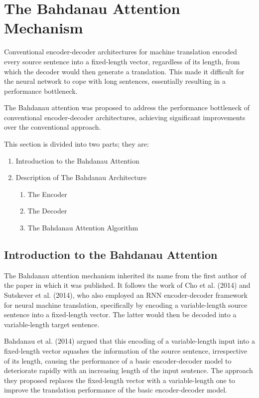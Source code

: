 \documentclass[10pt,a4paper]{article}
\begin{document}
\section{The Bahdanau Attention Mechanism}

Conventional encoder-decoder architectures for machine translation encoded every source sentence into a fixed-length vector, regardless of its length, from which the decoder would then generate a translation. This made it difficult for the neural network to cope with long sentences, essentially resulting in a performance bottleneck. 

The Bahdanau attention was proposed to address the performance bottleneck of conventional encoder-decoder architectures, achieving significant improvements over the conventional approach. 


This section is divided into two parts; they are:
\begin{enumerate}
\item Introduction to the Bahdanau Attention
\item Description of The Bahdanau Architecture
\begin{enumerate}
\item The Encoder
\item The Decoder
\item The Bahdanau Attention Algorithm
\end{enumerate}
\end{enumerate}

\subsection{Introduction to the Bahdanau Attention}

The Bahdanau attention mechanism inherited its name from the first author of the paper in which it was published. It follows the work of Cho et al. (2014) and Sutskever et al. (2014), who also employed an RNN encoder-decoder framework for neural machine translation, specifically by encoding a variable-length source sentence into a fixed-length vector. The latter would then be decoded into a variable-length target sentence. 

Bahdanau et al. (2014) argued that this encoding of a variable-length input into a fixed-length vector squashes the information of the source sentence, irrespective of its length, causing the performance of a basic encoder-decoder model to deteriorate rapidly with an increasing length of the input sentence. The approach they proposed replaces the fixed-length vector with a variable-length one to improve the translation performance of the basic encoder-decoder model. 
\end{document}
